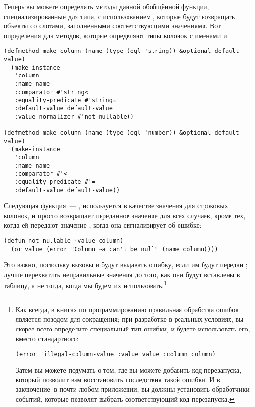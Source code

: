 Теперь вы можете определять методы данной обобщённой функции, специализированные для типа,
с использованием , которые будут возвращать объекты  со слотами,
заполненными соответствующими значениями.  Вот определения для методов, которые определяют
типы колонок с именами  и :

\begin{lstlisting}
(defmethod make-column (name (type (eql 'string)) &optional default-value)
  (make-instance
   'column 
   :name name
   :comparator #'string< 
   :equality-predicate #'string=
   :default-value default-value
   :value-normalizer #'not-nullable))

(defmethod make-column (name (type (eql 'number)) &optional default-value)
  (make-instance 
   'column
   :name name
   :comparator #'< 
   :equality-predicate #'=
   :default-value default-value))
\end{lstlisting}

Следующая функция~--- , используется в качестве значения
 для строковых колонок, и просто возвращает переданное значение для
всех случаев, кроме тех, когда ей передают значение , когда она сигнализирует об
ошибке:

\begin{lstlisting}
(defun not-nullable (value column)
  (or value (error "Column ~a can't be null" (name column))))
\end{lstlisting}

Это важно, поскольку вызовы  и  будут выдавать ошибку, если им
будут передан ; лучше перехватить неправильные значения до того, как они будут
вставлены в таблицу, а не тогда, когда мы будем их использовать.\footnote{Как всегда, в
  книгах по программированию правильная обработка ошибок является поводом для сокращения;
  при разработке в реальных условиях, вы скорее всего определите специальный тип ошибки, и
  будете использовать его, вместо стандартного:

\begin{lstlisting}
(error 'illegal-column-value :value value :column column)
\end{lstlisting}

Затем вы можете подумать о том, где вы можете добавить код перезапуска, который позволит
вам восстановить последствия такой ошибки.  И в заключение, в почти любом приложении, вы
должны установить обработчики событий, которые позволят выбрать соответствующий код
перезапуска.}

